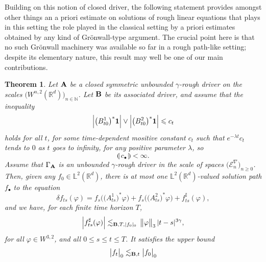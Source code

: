 \documentclass[11pt,a4paper]{amsart}
\newcommand{\NN}{\mathbb{N}}  \newcommand{\ZZ}{\mathbb{Z}}  \newcommand{\QQ}{\mathbb{Q}}  \newcommand{\HH}{\mathbb{H}}
\newcommand{\RR}{\mathbb{R}}  \newcommand{\CC}{\mathbb{C}}  \newcommand{\LL}{\mathbb{L}}  \newcommand{\WW}{\mathbb{W}}
\newcommand{\mcE}{\mathcal{E}}
\renewcommand{\leq}{\leqslant}
\renewcommand{\geq}{\geqslant}
\newcommand{\ssk}{\smallskip}
\newtheorem{thm}{\hspace{-0.15cm}  {\sc Theorem} } %
\numberwithin{equation}{section} %
\begin{document}
\medskip

Building on this notion of closed driver, the following statement provides amongst other things an a priori estimate on solutions of rough linear equations that plays in this setting the role played in the classical setting by a priori estimates obtained by any kind of Gr\"onwall-type argument. The crucial point here is that no such Gr\"onwall machinery was available so far in a rough path-like setting; despite its elementary nature, this result may well be one of our main contributions. 

\ssk

\begin{thm}
\label{ThmRDEHilbertGeneralClosed}
Let $\bf A$ be a \emph{closed symmetric} unbounded $\gamma$-rough driver on the scales $\big(W^{n,2}(\RR^d)\big)_{n\in\NN}$. Let $\bf B$ be its associated driver, and assume that the inequality
\begin{equation}
\label{BoundPhi}
\Big|\big(B^1_{t0}\big)^*{\bf 1} \Big| \vee \Big|\big(B^2_{t0}\big)^*{\bf 1} \Big| \leq c_t
\end{equation}
holds for all $t$, for some time-dependent mositive constant $c_t$ such that $e^{-\lambda t}c_t$ tends to $0$ as $t$ goes to infinity, for any positive parameter $\lambda$, so
$$
\llparenthesis\,c_\bullet\,\rrparenthesis < \infty.
$$
Assume that $\Gamma_{\bf A}$ is an unbounded $\gamma$-rough driver in the scale of spaces $\big(\mcE^\nabla_n\big)_{n\geq 0}$. Then, given any $f_0\in\LL^2(\RR^d)$, there is at most one $\LL^2(\RR^d)$-valued solution path $f_\bullet$ to the equation
\begin{equation}
\label{EqLinearRDEHilbert}
\delta f_{ts}(\varphi) = f_s\Big(\big(A^1_{ts}\big)^*\varphi\Big) + f_s\Big(\big(A^2_{ts}\big)^*\varphi\Big) + f^\sharp_{ts}(\varphi),
\end{equation}
and we have, for each finite time horizon $T$, 
\begin{equation}
\label{EqBoundRemainder}
\Big| f^\sharp_{ts}(\varphi) \Big| \lesssim_{{\bf B},T, | f_0|_0}\,\big\|\varphi\big\|_3\,|t-s|^{3\gamma},
\end{equation}
for all $\varphi\in W^{3,2}$, and all $0\leq s\leq t\leq T$. It satisfies the upper bound
\begin{equation}
\label{EqAPrioriBoundNorm}
\big| f_t\big|_0\lesssim_{{\bf B}, t} \big| f_0\big|_0
\end{equation}
\end{thm}

\ssk
 
\end{document}
